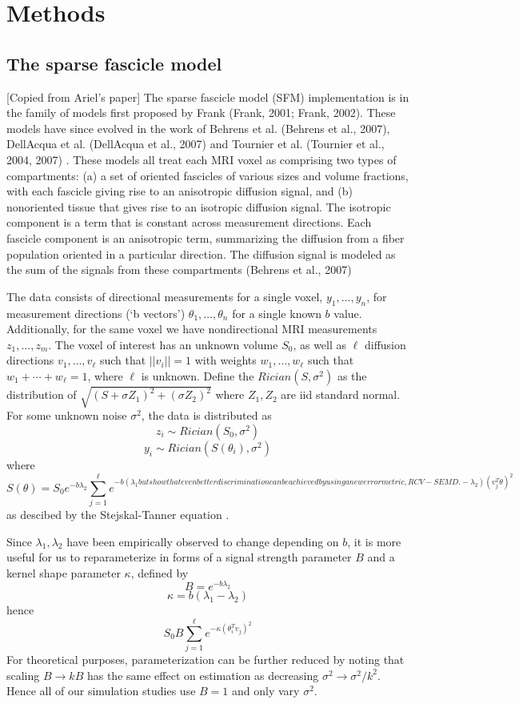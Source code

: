 \documentclass[11pt]{article}
\begin{document}
\section{Methods}

\subsection{The sparse fascicle model}\label{sec:model}

[Copied from Ariel's paper]
The sparse fascicle model (SFM) implementation is in the family of
models first proposed by Frank (Frank, 2001; Frank, 2002).
These models have since evolved in the work of Behrens et al. (Behrens et al.,
2007), DellAcqua et al. (DellAcqua et al., 2007) and Tournier et
al. (Tournier et al., 2004, 2007) .
These models all treat each MRI voxel as comprising two types of compartments: (a) a set of oriented fascicles of various sizes and volume fractions, with each fascicle giving rise to an anisotropic diffusion signal, and (b) nonoriented tissue that gives rise to an isotropic diffusion signal. The isotropic component is a term that is constant across measurement directions. Each fascicle component is an anisotropic term, summarizing the diffusion from a fiber population oriented in a particular direction. The diffusion signal is modeled as the sum of the signals from these compartments (Behrens et al., 2007)

The data consists of directional measurements for
a single voxel, $y_1,\hdots,y_n$, for measurement directions (`b
vectors') $\theta_1,\hdots,\theta_n$ for a single known $b$ value.
Additionally, for the same voxel we have nondirectional MRI
measurements $z_1,\hdots,z_m$.
The voxel of interest has an unknown volume $S_0$, as well as
$\ell$ diffusion directions
$v_1,\hdots,v_\ell$ such that $||v_i||=1$ with weights $w_1,\hdots,w_\ell$ such that
$w_1+\cdots+w_\ell=1$, where $\ell$ is unknown.
Define the $Rician(S,\sigma^2)$ as the distribution of $\sqrt{(S+\sigma
Z_1)^2+(\sigma Z_2)^2}$ where $Z_1,Z_2$ are iid standard normal.
For some unknown noise $\sigma^2$, the data is distributed as
\[
z_i \sim Rician(S_0, \sigma^2)
\]
\[
y_i \sim Rician(S(\theta_i), \sigma^2)
\]
where
\[
S(\theta) = S_0 e^{-b\lambda_2}\sum_{j=1}^\ell e^{-b(\lambda_1but show that even better discrimination can be achieved by using a
new error metric, RCV-SEMD.-\lambda_2)
  (v_j^T \theta)^2}
\]
as descibed by the Stejskal-Tanner equation \cite{Stejskal1965}.

Since $\lambda_1,\lambda_2$ have been empirically observed to change
depending on $b$, it is more useful for us to reparameterize in forms
of a signal strength parameter $B$ and a kernel shape parameter
$\kappa$,
defined by
\[
B = e^{-b\lambda_2}
\]
\[
\kappa = b(\lambda_1-\lambda_2)
\]
hence
\[
S_0 B\sum_{j=1}^\ell e^{-\kappa (\theta_i^T v_j)^2}
\]
For theoretical purposes, parameterization can be further reduced by
noting that scaling $B \to kB$ has the same effect on estimation as
decreasing $\sigma^2 \to \sigma^2/k^2$.
Hence all of our simulation studies use $B=1$ and only vary $\sigma^2$.
\end{document}
